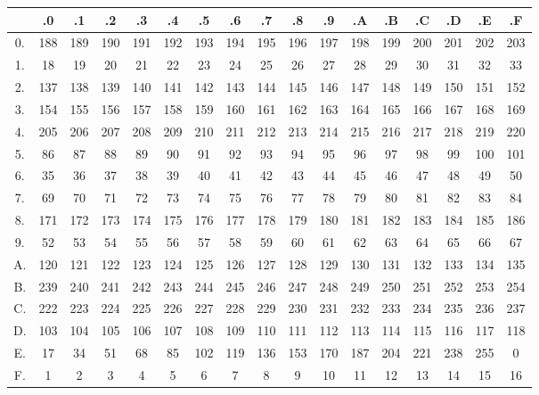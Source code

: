 \begin{table}
  \centering
  \footnotesize
  \renewcommand\tabcolsep{3pt}
  \renewcommand\arraystretch{1.2}
  \begin{tabular}{c|cccccccccccccccc}
    & .0 & .1 & .2 & .3 & .4 & .5 & .6 & .7 & .8 & .9 & .A & .B & .C & .D & .E & .F \\
    \hline
    0. & 188 & 189 & 190 & 191 & 192 & 193 & 194 & 195 & 196 & 197 & 198 & 199 & 200 & 201 & 202 & 203 \\
    1. &  18 &  19 &  20 &  21 &  22 &  23 &  24 &  25 &  26 &  27 &  28 &  29 &  30 &  31 &  32 &  33 \\
    2. & 137 & 138 & 139 & 140 & 141 & 142 & 143 & 144 & 145 & 146 & 147 & 148 & 149 & 150 & 151 & 152 \\
    3. & 154 & 155 & 156 & 157 & 158 & 159 & 160 & 161 & 162 & 163 & 164 & 165 & 166 & 167 & 168 & 169 \\
    4. & 205 & 206 & 207 & 208 & 209 & 210 & 211 & 212 & 213 & 214 & 215 & 216 & 217 & 218 & 219 & 220 \\
    5. &  86 &  87 &  88 &  89 &  90 &  91 &  92 &  93 &  94 &  95 &  96 &  97 &  98 &  99 & 100 & 101 \\
    6. &  35 &  36 &  37 &  38 &  39 &  40 &  41 &  42 &  43 &  44 &  45 &  46 &  47 &  48 &  49 &  50 \\
    7. &  69 &  70 &  71 &  72 &  73 &  74 &  75 &  76 &  77 &  78 &  79 &  80 &  81 &  82 &  83 &  84 \\
    8. & 171 & 172 & 173 & 174 & 175 & 176 & 177 & 178 & 179 & 180 & 181 & 182 & 183 & 184 & 185 & 186 \\
    9. &  52 &  53 &  54 &  55 &  56 &  57 &  58 &  59 &  60 &  61 &  62 &  63 &  64 &  65 &  66 &  67 \\
    A. & 120 & 121 & 122 & 123 & 124 & 125 & 126 & 127 & 128 & 129 & 130 & 131 & 132 & 133 & 134 & 135 \\
    B. & 239 & 240 & 241 & 242 & 243 & 244 & 245 & 246 & 247 & 248 & 249 & 250 & 251 & 252 & 253 & 254 \\
    C. & 222 & 223 & 224 & 225 & 226 & 227 & 228 & 229 & 230 & 231 & 232 & 233 & 234 & 235 & 236 & 237 \\
    D. & 103 & 104 & 105 & 106 & 107 & 108 & 109 & 110 & 111 & 112 & 113 & 114 & 115 & 116 & 117 & 118 \\
    E. &  17 &  34 &  51 &  68 &  85 & 102 & 119 & 136 & 153 & 170 & 187 & 204 & 221 & 238 & 255 &   0 \\
    F. &   1 &   2 &   3 &   4 &   5 &   6 &   7 &   8 &   9 &  10 &  11 &  12 &  13 &  14 &  15 &  16 \\
  \end{tabular}
\end{table}